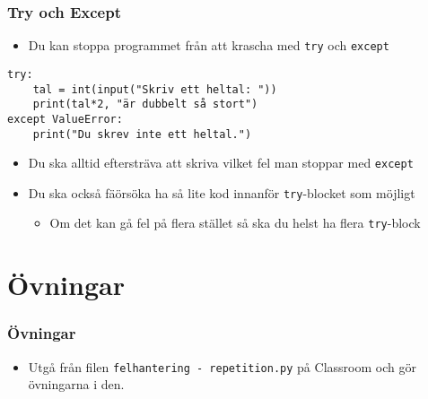 \documentclass[aspectratio=169]{beamer}
\begin{document}
\begin{frame}[fragile]
	\frametitle{Try och Except}

	\begin{itemize}
		\item Du kan stoppa programmet från att krascha med \lstinline!try! och \lstinline!except!
	\end{itemize}

	\begin{lstlisting}
try:
    tal = int(input("Skriv ett heltal: "))
    print(tal*2, "är dubbelt så stort")
except ValueError:
    print("Du skrev inte ett heltal.")
	\end{lstlisting}

	\begin{itemize}
		\item Du ska alltid eftersträva att skriva vilket fel man stoppar med \lstinline!except!
		\item Du ska också fäörsöka ha så lite kod innanför \lstinline!try!-blocket som möjligt
		\begin{itemize}
			\item Om det kan gå fel på flera stället så ska du helst ha flera \lstinline!try!-block
		\end{itemize}
	\end{itemize}

\end{frame}

\section{Övningar}

\begin{frame}
	\frametitle{Övningar}

	\begin{itemize}
		\item Utgå från filen \texttt{felhantering - repetition.py} på Classroom och gör övningarna i den.
	\end{itemize}

\end{frame}
\end{document}

